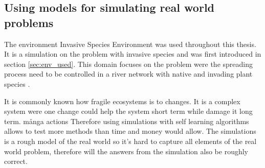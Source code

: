 \subsection{Using models for simulating real world problems }
\label{sec:ethics_inv_spec}


The environment Invasive Species Environment was used throughout this thesis. It is a simulation on the problem with invasive species and was first introduced in section \ref{sec:env_used}. This domain focuses on the problem were the spreading process need to be controlled in a river network with native and invading plant species \parencite{invasiveSpecis2014:Online}. 





It is commonly known how fragile ecosystems is to changes. It is a complex system were one change could help the system short term while damage it long term. många actions Therefore using simulations with self learning algorithms allows to test more methods than time and money would allow. The simulations is a rough model of the real world so it's hard to capture all elements of the real world problem, therefore will the answers from the simulation also be roughly correct.

